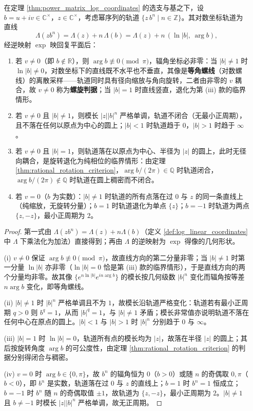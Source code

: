 \begin{corollary}[螺旋判据]\label{cor:spiral_criterion}
在定理 \ref{thm:power_matrix_log_coordinates} 的选支与基之下，设 $b=u+iv\in\mathbb{C}^{\times}$，$z\in\mathbb{C}^{\times}$，考虑幂序列的轨道 $\{z\,b^n\mid n\in\mathbb{Z}\}$。其对数坐标轨道为直线
\[
\Lambda(zb^n)=\Lambda(z)+n\,\Lambda(b)=\Lambda(z)+n\,(\ln|b|,\ \arg b),
\]
经逆映射 $\exp$ 映回复平面后：
\begin{enumerate}[label=(\roman*)]
    \item 若 $v\neq0$（即 $b\notin\mathbb{R}$），则 $\arg b\not\equiv0\pmod{\pi}$，辐角坐标必非零：当 $|b|\neq1$ 时 $\ln|b|\neq0$，对数坐标下的直线既不水平也不垂直，其像是\textbf{等角螺线}（对数螺线）的离散采样——轨道同时具有径向缩放与角向旋转，二者由非零的 $v$ 耦合，故 $v\neq0$ 称为\textbf{螺旋判据}；当 $|b|=1$ 时直线竖直，退化为第 (iii) 款的临界情形。
    \item 若 $v\neq0$ 且 $|b|\neq1$，则模长 $|z||b|^n$ 严格单调，轨道不闭合（无最小正周期），且不落在任何以原点为中心的圆上；$|b|<1$ 时轨道趋于 $0$，$|b|>1$ 时趋于 $\infty$。
    \item 若 $v\neq0$ 且 $|b|=1$，则轨道落在以原点为中心、半径为 $|z|$ 的圆上，此时无径向耦合，是旋转退化为纯相位的临界情形：由定理 \ref{thm:rational_rotation_criterion}，$\arg b/(2\pi)\in\mathbb{Q}$ 时轨道闭合，$\arg b/(2\pi)\notin\mathbb{Q}$ 时轨道在圆上稠密而不闭合。
    \item 若 $v=0$（$b$ 为实数）：$|b|\neq1$ 时轨道的所有点落在过 $0$ 与 $z$ 的同一条直线上（纯缩放，无旋转分量）；$b=1$ 时轨道退化为单点 $\{z\}$；$b=-1$ 时轨道为两点 $\{z,-z\}$，最小正周期为 $2$。
\end{enumerate}
\end{corollary}

\begin{proof}
第一式由 $\Lambda(zb^n)=\Lambda(z)+n\Lambda(b)$（定义 \ref{def:log_linear_coordinates} 中 $\Lambda$ 下乘法化为加法）直接得到；再由 $\Lambda$ 的逆映射为 $\exp$ 得像的几何形状。

(i) $v\neq0$ 保证 $\arg b\not\equiv0\pmod{\pi}$，故直线方向的第二分量非零；当 $|b|\neq1$ 时第一分量 $\ln|b|$ 亦非零（$\ln|b|=0$ 恰是第 (iii) 款的临界情形），于是直线方向的两个分量均非零。故其像 $\{e^{n\ln|b|}e^{in\arg b}\}$ 的模长按几何级数 $|b|^n$ 变化而辐角按等差 $n\arg b$ 变化，即等角螺线。

(ii) $|b|\neq1$ 时 $|b|^n$ 严格单调且不为 $1$，故模长沿轨道严格变化：轨道若有最小正周期 $q>0$ 则 $b^q=1$，从而 $|b|^q=1$，与 $|b|\neq1$ 矛盾；模长非常值亦说明轨道不落在任何中心在原点的圆上。$|b|<1$ 与 $|b|>1$ 时 $|b|^n$ 分别趋于 $0$ 与 $\infty$。

(iii) $|b|=1$ 时 $\ln|b|=0$，轨道所有点的模长均为 $|z|$，故落在半径 $|z|$ 的圆上；其后按旋转角度 $\arg b$ 的可公度性，由定理 \ref{thm:rational_rotation_criterion} 的判据分别得闭合与稠密。

(iv) $v=0$ 时 $\arg b\in\{0,\pi\}$，故 $b^n$ 的辐角恒为 $0$（$b>0$）或随 $n$ 的奇偶取 $0,\pi$（$b<0$），即 $b^n$ 是实数，轨道落在过 $0$ 与 $z$ 的直线上；$b=1$ 时 $b^n=1$ 恒成立；$b=-1$ 时 $b^n$ 随 $n$ 的奇偶取值 $\pm1$，故轨道为 $\{z,-z\}$，最小正周期为 $2$。$|b|\neq1$ 且 $b\neq-1$ 时模长 $|z||b|^n$ 严格单调，故无正周期。
\end{proof}

